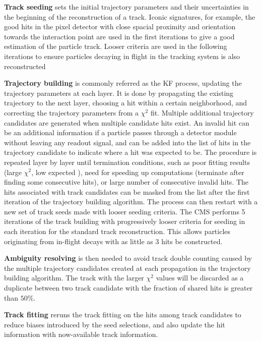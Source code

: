 \textbf{Track seeding} sets the initial trajectory parameters and their uncertainties in the beginning of the reconstruction of a track.
Iconic signatures, for example, the good hits in the pixel detector with close spacial proximity and orientation towards the interaction point are used in the first iterations to give a good estimation of the particle track.
Looser criteria are used in the following iterations to ensure particles decaying in flight in the tracking system is also reconstructed

\textbf{Trajectory building} is commonly referred as the KF process, updating the trajectory parameters at each layer.
It is done by propagating the existing trajectory to the next layer, choosing a hit within a certain neighborhood, and correcting the trajectory parameters from a $\chi^2$ fit.
Multiple additional trajectory candidates are generated when multiple candidate hits exist.
An invalid hit can be an additional information if a particle passes through a detector module without leaving any readout signal, and can be added into the list of hits in the trajectory candidate to indicate where a hit was expected to be.
The procedure is repeated layer by layer until termination conditions, such as poor fitting results (large $\chi^2$, low expected \PT), need for speeding up computations (terminate after finding some consecutive hits), or large number of consecutive invalid hits. 
The hits associated with track candidates can be masked from the list after the first iteration of the trajectory building algorithm.
The process can then restart with a new set of track seeds made with looser seeding criteria.
The CMS performs 5 iterations of the track building with progressively looser criteria for seeding in each iteration for the standard track reconstruction.
This allows particles originating from in-flight decays with as little as 3 hits be constructed.

\textbf{Ambiguity resolving} is then needed to avoid track double counting caused by the multiple trajectory candidates created at each propagation in the trajectory building algorithm.
The track with the larger $\chi^2$ values will be discarded as a duplicate between two track candidate with the fraction of shared hits is greater than $50\%$.

\textbf{Track fitting} reruns the track fitting on the hits among track candidates to reduce biases introduced by the seed selections, and also update the hit information with now-available track information.

